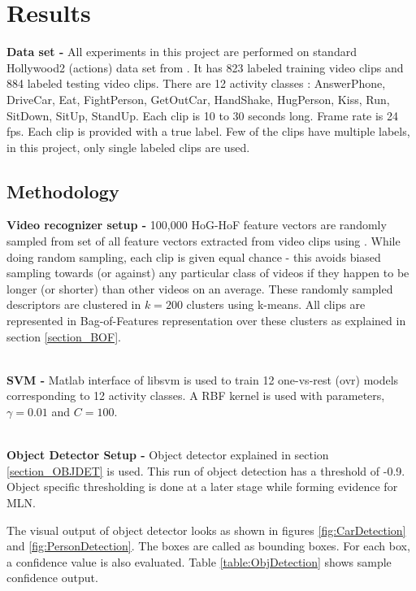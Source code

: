 \chapter{Results}

\label{ch5_RESULTS}
{\bf Data set - } All experiments in this project are performed on standard Hollywood2 (actions) 
\cite{hollywood2} data set from \cite{actionsInContext}. 
It has 823 labeled training video clips and 884 labeled testing video clips. 
There are 12 activity classes : AnswerPhone, DriveCar, Eat, FightPerson,
 GetOutCar, HandShake, HugPerson, Kiss, Run, SitDown, SitUp, StandUp.
 Each clip is 10 to 30 seconds long. Frame rate is 24 fps.
 Each clip is provided with a true label. Few of the clips have multiple labels, in this project, only single labeled clips are used.


 \section{Methodology}
 \label{section_METHODOLOGY}
 {\bf Video recognizer setup - } 100,000 HoG-HoF feature vectors are randomly sampled from 
 set of all feature vectors extracted from video clips using \cite{stipCode}.
 While doing random sampling, each clip is given equal chance - this avoids biased sampling
towards (or against) any particular class of videos if they happen to be longer (or shorter) than other videos on an average.
These randomly sampled descriptors are clustered in $k = 200$ clusters using k-means.
All clips are represented in Bag-of-Features representation over these clusters as explained in section \ref{section_BOF}.

~\\
{\bf SVM - } Matlab interface of libsvm \cite{libsvm} is used to train 
12 one-vs-rest (ovr) models corresponding to 12 activity classes. A RBF kernel is used with parameters, $\gamma = 0.01$ and $C = 100$.

~\\
{\bf Object Detector Setup - } Object detector explained in section \ref{section_OBJDET} is used. 
This run of object detection has a threshold of -0.9. 
Object specific thresholding is done at a later stage while forming evidence for MLN.

The visual output of object detector looks as shown in figures \ref{fig:CarDetection} and \ref{fig:PersonDetection}. 
The boxes are called as bounding boxes.
For each box, a confidence value is also evaluated.
Table \ref{table:ObjDetection} shows sample confidence output.

